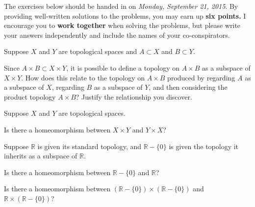 \documentclass[12pt]{pset}
\author{Jim Fowler}
\date{Autumn 2015}
\newcommand{\RR}{\mathbb{R}}
\begin{document}
\maketitle

\noindent The exercises below should be handed in on \textit{Monday, September
  21, 2015}.  By providing well-written solutions to the problems, you
may earn up \textbf{six points.}  I encourage you to \textbf{work
  together} when solving the problems, but please write your answers
independently and include the names of your co-conspirators.

\begin{problem}

  Suppose $X$ and $Y$ are topological spaces and $A \subset X$ and $B \subset Y$.

  Since $A \times B \subset X \times Y$, it is possible to define a
  topology on $A \times B$ as a subspace of $X \times Y$.  How does
  this relate to the topology on $A \times B$ produced by regarding
  $A$ as a subspace of $X$, regarding $B$ as a subspace of $Y$, and
  then considering the product topology $A \times B$?  Justify the
  relationship you discover.

\end{problem}

\begin{problem}

  Suppose $X$ and $Y$ are topological spaces.

  Is there a homeomorphism between $X \times Y$ and $Y \times X$?

\end{problem}

\begin{problem}

  Suppose $\RR$ is given its standard topology, and $\RR - \{0\}$ is
  given the topology it inherits as a subspace of $\RR$.

  Is there a homeomorphism between $\RR - \{0\}$ and $\RR$?  

  Is there a homeomorphism between $\left(\RR - \{0\}\right) \times \left(\RR - \{0\}\right)$ and $\RR \times \left(\RR - \{0\}\right)$?  

\end{problem}
\end{document}
